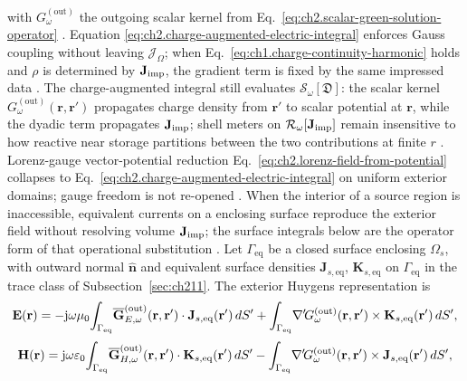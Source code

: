 with \(G_\omega^{\mathrm{(out)}}\) the outgoing scalar kernel from
Eq.~\eqref{eq:ch2.scalar-green-solution-operator} \cite{stratton1941}. Equation
\eqref{eq:ch2.charge-augmented-electric-integral} enforces Gauss coupling without leaving
\(\mathcal{J}_\Omega\); when Eq.~\eqref{eq:ch1.charge-continuity-harmonic} holds and
\(\rho\) is determined by \(\mathbf{J}_{\mathrm{imp}}\), the gradient term is fixed by the same impressed data
\cite{stratton1941}. The charge-augmented integral still evaluates
$\mathcal{S}_\omega[\mathfrak{D}]$: the scalar kernel $G_\omega^{\mathrm{(out)}}(\mathbf{r},\mathbf{r}')$
propagates charge density from $\mathbf{r}'$ to scalar potential at $\mathbf{r}$, while the
dyadic term propagates $\mathbf{J}_{\mathrm{imp}}$; shell meters on $\mathcal{R}_\omega[\mathbf{J}_{\mathrm{imp}}]$ remain insensitive
to how reactive near storage partitions between the two contributions at finite $r$
\cite{harrington2001}. Lorenz-gauge vector-potential reduction
Eq.~\eqref{eq:ch2.lorenz-field-from-potential} collapses to
Eq.~\eqref{eq:ch2.charge-augmented-electric-integral} on uniform exterior domains; gauge
freedom is not re-opened \cite{harrington2001}.
When the interior of a source region is inaccessible, equivalent currents on a enclosing
surface reproduce the exterior field without resolving volume \(\mathbf{J}_{\mathrm{imp}}\); the surface integrals
below are the operator form of that operational substitution \cite{stratton1941}. Let
\(\Gamma_{\mathrm{eq}}\) be a closed surface enclosing \(\Omega_s\), with outward
normal \(\hat{\mathbf{n}}\) and equivalent surface densities
\(\mathbf{J}_{s,\mathrm{eq}}\), \(\mathbf{K}_{s,\mathrm{eq}}\) on
\(\Gamma_{\mathrm{eq}}\) in the trace class of Subsection~\ref{sec:ch211}. The exterior
Huygens representation is
\begin{equation}
\label{eq:ch2.huygens-equivalent-integral}
\mathbf{E}(\mathbf{r})
=
-\mathrm{j}\omega\mu_0\!\int_{\Gamma_{\mathrm{eq}}}\!
\overline{\mathbf{G}}_{E,\omega}^{\mathrm{(out)}}(\mathbf{r},\mathbf{r}')\cdot
\mathbf{J}_{s,\mathrm{eq}}(\mathbf{r}')\,dS'
+\int_{\Gamma_{\mathrm{eq}}}\!
\nabla'\!G_\omega^{\mathrm{(out)}}(\mathbf{r},\mathbf{r}')\times
\mathbf{K}_{s,\mathrm{eq}}(\mathbf{r}')\,dS',
\end{equation}
\begin{equation}
\label{eq:ch2.huygens-magnetic-integral}
\mathbf{H}(\mathbf{r})
=
\mathrm{j}\omega\varepsilon_0\!\int_{\Gamma_{\mathrm{eq}}}\!
\overline{\mathbf{G}}_{H,\omega}^{\mathrm{(out)}}(\mathbf{r},\mathbf{r}')\cdot
\mathbf{K}_{s,\mathrm{eq}}(\mathbf{r}')\,dS'
-\int_{\Gamma_{\mathrm{eq}}}\!
\nabla'\!G_\omega^{\mathrm{(out)}}(\mathbf{r},\mathbf{r}')\times
\mathbf{J}_{s,\mathrm{eq}}(\mathbf{r}')\,dS',
\end{equation}
